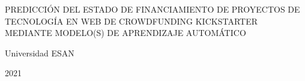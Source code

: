 \begin{center}
	{PREDICCIÓN DEL ESTADO DE FINANCIAMIENTO DE PROYECTOS DE TECNOLOGÍA EN WEB DE CROWDFUNDING KICKSTARTER MEDIANTE MODELO(S) DE APRENDIZAJE AUTOMÁTICO}
\end{center}

\vspace{2.5cm}

\dotfill

\vspace{1.5cm}

\dotfill

\vspace{1.5cm}

\dotfill

\vspace{1.5cm}

\centerline{Universidad ESAN}
\centerline{2021}